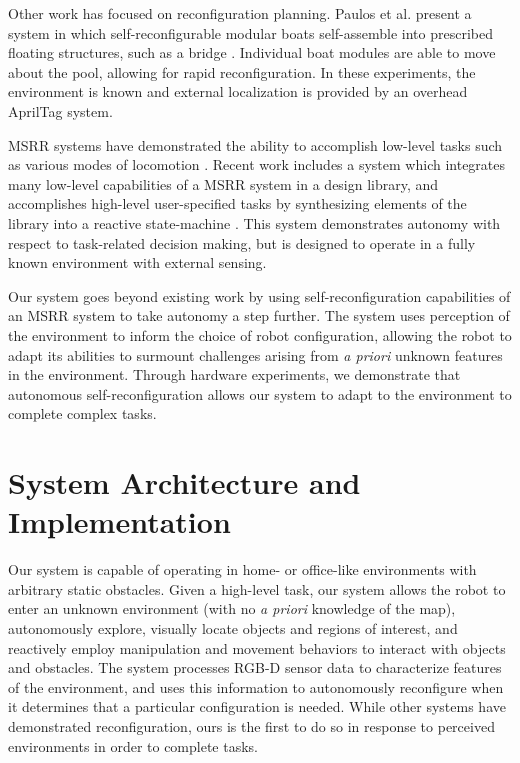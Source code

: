 \documentclass[journal]{IEEEtran}
\begin{document}
Other work has focused on reconfiguration planning.  Paulos et al. present a system in which self-reconfigurable modular boats self-assemble into prescribed floating structures, such as a bridge \cite{Paulos2015}.  Individual boat modules are able to move about the pool, allowing for rapid reconfiguration.  In these experiments, the environment is known and external localization is provided by an overhead AprilTag system. 

MSRR systems have demonstrated the ability to accomplish low-level tasks such as various modes of locomotion \cite{Yim1994}.
Recent work includes a system which integrates many low-level capabilities of a MSRR system in a design library, and accomplishes high-level user-specified tasks by synthesizing elements of the library into a reactive state-machine \cite{Jing2016}. This system demonstrates autonomy with respect to task-related decision making, but is designed to operate in a fully known environment with external sensing.

Our system goes beyond existing work by using self-reconfiguration capabilities of an MSRR system to take autonomy a step further.  The system uses perception of the environment to inform the choice of robot configuration, allowing the robot to adapt its abilities to surmount challenges arising from \textit{a priori} unknown features in the environment. Through hardware experiments, we demonstrate that autonomous self-reconfiguration allows our system to adapt to the environment to complete complex tasks.

\section{System Architecture and Implementation}\label{sec:system}
%
%
Our system is capable of operating in home- or office-like environments with arbitrary static obstacles. Given a high-level task, our system allows the robot to enter an unknown environment (with no \textit{a priori} knowledge of the map), autonomously explore, visually locate objects and regions of interest, and reactively employ manipulation and movement behaviors to interact with objects and obstacles. The system processes RGB-D sensor data to characterize features of the environment, and uses this information to autonomously reconfigure when it determines that a particular configuration is needed.
While other systems have demonstrated reconfiguration, ours is the first to do so in response to perceived environments in order to complete tasks.
\end{document}
